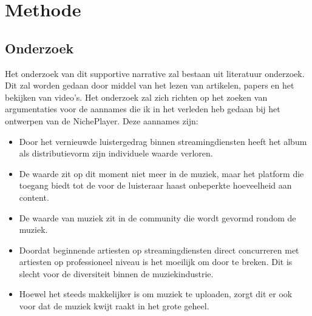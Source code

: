 \section{Methode}

\subsection{Onderzoek}

Het onderzoek van dit supportive narrative zal bestaan uit literatuur onderzoek. Dit zal worden gedaan door middel van het lezen van artikelen, papers en het bekijken van video's.
Het onderzoek zal zich richten op het zoeken van argumentaties voor de aannames die ik in het verleden heb gedaan bij het ontwerpen van de NichePlayer. Deze aannames zijn:

\begin{itemize}
  \item Door het vernieuwde luistergedrag binnen streamingdiensten heeft het album als distributievorm zijn individuele waarde verloren.
  \item De waarde zit op dit moment niet meer in de muziek, maar het platform die toegang biedt tot de voor de luisteraar haast onbeperkte hoeveelheid aan content.
  \item De waarde van muziek zit in de community die wordt gevormd rondom de muziek.
  \item Doordat beginnende artiesten op streamingdiensten direct concurreren met artiesten op professioneel niveau is het moeilijk om door te breken. Dit is slecht voor de diversiteit binnen de muziekindustrie.
  \item Hoewel het steeds makkelijker is om muziek te uploaden, zorgt dit er ook voor dat de muziek kwijt raakt in het grote geheel.
\end{itemize}

